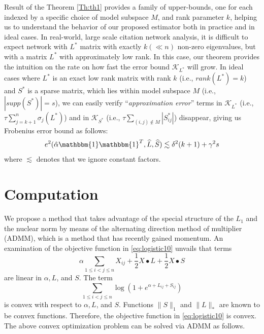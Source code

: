 \documentclass[AMS,STIX1COL]{WileyNJD-v2}
\begin{document}
{Result of the Theorem \ref{Th:th1} provides a family of upper-bounds, one for each indexed by a specific choice of model subspace $M$, and rank parameter $k$, helping us to understand the behavior of our proposed estimator both in practice and in ideal cases. In real-world, large scale citation network analysis, it is difficult to expect network with $L^*$ matrix with exactly $k(\ll n)$ non-zero eigenvalues, but with a matrix $L^*$ with approximately low rank.
In this case, our theorem provides the intuition on the rate on how fast the error bound $\mathcal{K}_{L^*}$ will grow.
In ideal cases where $L^*$ is an exact low rank matrix with rank $k$ (i.e., $rank(L^*)=k$) and $S^*$ is a sparse matrix, which lies within model subspace $M$ (i.e., $|supp(S^*)|=s$), we can easily verify ``\emph{approximation error}'' terms in $\mathcal{K}_{L^*}$ (i.e., $\tau\sum_{j=k+1}^{n}\sigma_j(L^*)$) and in $\mathcal{K}_{S^*}$ (i.e., $\tau\sum_{(i,j)\notin M}|S_{ij}^*|$) disappear, giving us Frobenius error bound as follows:
\[
    e^{2}(\hat{\alpha}\mathbbm{1}\mathbbm{1}^T,\widehat{L},\widehat{S}) \lesssim \delta^2(k+1)+\gamma^2s
\]
where $\lesssim$ denotes that we ignore constant factors.

\section{Computation}
\label{sec:compute}

We propose a method that takes advantage of the special structure
of the $L_1$ and the nuclear norm by means of the
alternating direction method of multiplier (ADMM), which is a method
that has recently gained momentum.
An examination of the objective function in \eqref{eq:logistic10} unvails that
terms
\[
\alpha \sum_{1\le i< j\le n}X_{ij} +\frac{1}{2} X \bullet L +\frac{1}{2} X \bullet S
\]
are linear in $\alpha,  L$, and $S$.
The term
\[
\sum_{1\le i<j\le n} \log \left(1 + e^{\alpha + L_{ij} +S_{ij}}\right)
\]
is convex with respect to $\alpha,  L$, and $S$.
Functions $\|S\|_1$ and $\|L\|_\ast$ are known to be convex functions.
Therefore, the objective function in \eqref{eq:logistic10} is convex.
The above convex optimization problem can be solved via ADMM as follows.


}
\end{document}
